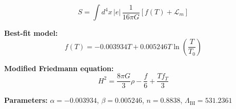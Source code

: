 
\begin{equation}
  S = \int d^4x \, |e| \, \frac{1}{16\pi G} \left[ f(T) + \mathcal{L}_m \right]
\end{equation}

\textbf{Best-fit model:}
\begin{equation}
  f(T) = -0.003934 T + 0.005246 T \ln\!\left(\frac{T}{T_0}\right)
\end{equation}

\textbf{Modified Friedmann equation:}
\begin{equation}
  H^2 = \frac{8\pi G}{3} \rho - \frac{f}{6} + \frac{T f_T}{3}
\end{equation}

\textbf{Parameters:}
$\alpha = -0.003934$, \quad
$\beta = 0.005246$, \quad
$n = 0.8838$, \quad
$\Lambda_{\text{BI}} = 531.2361$